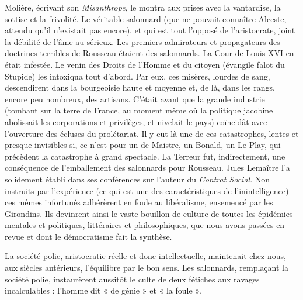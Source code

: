 \documentclass[french,twoside]{book} %
\begin{document}
Molière, écrivant son {\itshape Misanthrope}, le montra aux prises avec la vantardise, la sottise et la frivolité. Le véritable salonnard (que ne pouvait connaître Alceste, attendu qu’il n’existait pas encore), et qui est tout l’opposé de l’aristocrate, joint la débilité de l’âme au sérieux. Les premiers admirateurs et propagateurs des doctrines terribles de Rousseau étaient des salonnards. La Cour de Louis XVI en était infestée. Le venin des Droits de l’Homme et du citoyen (évangile falot du Stupide) les intoxiqua tout d’abord. Par eux, ces misères, lourdes de sang, descendirent dans la bourgeoisie haute et moyenne et, de là, dans les rangs, encore peu nombreux, des artisans. C’était avant que la grande industrie (tombant sur la terre de France, au moment même où la politique jacobine abolissait les corporations et privilèges, et nivelait le pays) coïncidât avec l’ouverture des écluses du prolétariat. Il y eut là une de ces catastrophes, lentes et presque invisibles si, ce n’est pour un de Maistre, un Bonald, un Le Play, qui précèdent la catastrophe à grand spectacle. La Terreur fut, indirectement, une conséquence de l’emballement des salonnards pour Rousseau. Jules Lemaître l’a solidement établi dans ses conférences sur l’auteur du {\itshape Contrat Social}. Non instruits par l’expérience (ce qui est une des caractéristiques de l’inintelligence) ces mêmes infortunés adhérèrent en foule au libéralisme, ensemencé par les Girondins. Ils devinrent ainsi le vaste bouillon de culture de toutes les épidémies mentales et politiques, littéraires et philosophiques, que nous avons passées en revue et dont le démocratisme fait la synthèse.\par
La société polie, aristocratie réelle et donc intellectuelle, maintenait chez nous, aux siècles antérieurs, l’équilibre par le bon sens. Les salonnards, remplaçant la société polie, instaurèrent aussitôt le culte de deux fétiches aux ravages incalculables : l’homme dit « de génie » et « la foule ».\par
\end{document}
